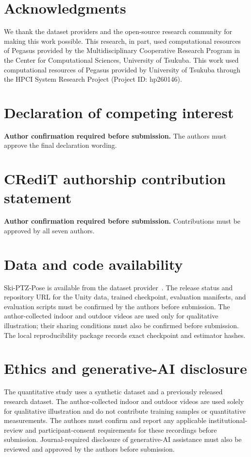 \documentclass[preprint,12pt]{elsarticle}
\begin{document}
\section*{Acknowledgments}
We thank the dataset providers and the open-source research community for making this work possible. This research, in part, used computational resources of Pegasus provided by the Multidisciplinary Cooperative Research Program in the Center for Computational Sciences, University of Tsukuba. This work used computational resources of Pegasus provided by University of Tsukuba through the HPCI System Research Project (Project ID: hp260146).

\section*{Declaration of competing interest}
\textbf{Author confirmation required before submission.} The authors must approve the final declaration wording.

\section*{CRediT authorship contribution statement}
\textbf{Author confirmation required before submission.} Contributions must be approved by all seven authors.

\section*{Data and code availability}
Ski-PTZ-Pose is available from the dataset provider~\cite{ski_poseptz_dataset}. The release status and repository URL for the Unity data, trained checkpoint, evaluation manifests, and evaluation scripts must be confirmed by the authors before submission. The author-collected indoor and outdoor videos are used only for qualitative illustration; their sharing conditions must also be confirmed before submission. The local reproducibility package records exact checkpoint and estimator hashes.

\section*{Ethics and generative-AI disclosure}
The quantitative study uses a synthetic dataset and a previously released research dataset. The author-collected indoor and outdoor videos are used solely for qualitative illustration and do not contribute training samples or quantitative measurements. The authors must confirm and report any applicable institutional-review and participant-consent requirements for these recordings before submission. Journal-required disclosure of generative-AI assistance must also be reviewed and approved by the authors before submission.

\setlength{\bibsep}{4pt}


\end{document}
